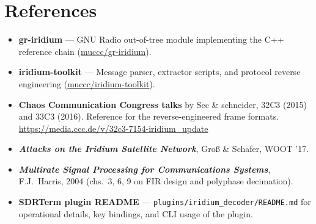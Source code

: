 \documentclass[11pt,a4paper]{article}
\begin{document}
\section{References}

\begin{itemize}
\item \textbf{gr-iridium} — GNU Radio out-of-tree module implementing
      the C++ reference chain (\href{https://github.com/muccc/gr-iridium}{muccc/gr-iridium}).
\item \textbf{iridium-toolkit} — Message parser, extractor scripts, and
      protocol reverse engineering
      (\href{https://github.com/muccc/iridium-toolkit}{muccc/iridium-toolkit}).
\item \textbf{Chaos Communication Congress talks} by Sec \& schneider,
      32C3 (2015) and 33C3 (2016). Reference for the reverse-engineered
      frame formats.\label{iridium-32c3}\\
      \url{https://media.ccc.de/v/32c3-7154-iridium_update}
\item \textbf{\emph{Attacks on the Iridium Satellite Network}},
      Groß \& Schafer, WOOT '17.
\item \textbf{\emph{Multirate Signal Processing for Communications
      Systems}}, F.J.\ Harris, 2004 (chs.\ 3, 6, 9 on FIR design and
      polyphase decimation).
\item \textbf{SDRTerm plugin README} —
      \texttt{plugins/iridium\_decoder/README.md} for operational
      details, key bindings, and CLI usage of the plugin.
\end{itemize}
\end{document}
